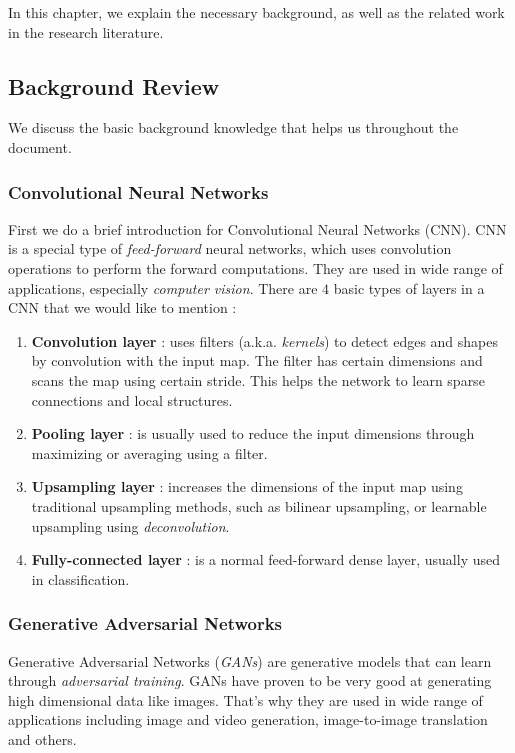 In this chapter, we explain the necessary background, as well as the related work in the research literature.

\subsection{Background Review}
We discuss the basic background knowledge that helps us throughout the document.

\subsubsection{Convolutional Neural Networks}
First we do a brief introduction for Convolutional Neural Networks (CNN). CNN is a special type of \emph{feed-forward} neural networks, which uses convolution operations to perform the forward computations. They are used in wide range of applications, especially \emph{computer vision}. There are $4$ basic types of layers in a CNN that we would like to mention :
\begin{enumerate}
    \item \textbf{Convolution layer} : uses filters (a.k.a. \emph{kernels}) to detect edges and shapes by convolution with the input map. The filter has certain dimensions and scans the map using certain stride. This helps the network to learn sparse connections and local structures.
    \item \textbf{Pooling layer} : is usually used to reduce the input dimensions through maximizing or averaging using a filter.
    \item \textbf{Upsampling layer} : increases the dimensions of the input map using traditional upsampling methods, such as bilinear upsampling, or learnable upsampling using \emph{deconvolution}.
    \item \textbf{Fully-connected layer} : is a normal feed-forward dense layer, usually used in classification.
\end{enumerate}

\subsubsection{Generative Adversarial Networks}
Generative Adversarial Networks (\emph{GANs}) \cite{goodfellow2014generative} are generative models that can learn through \emph{adversarial training}. GANs have proven to be very good at generating high dimensional data like images. That's why they are used in wide range of applications including image and video generation, image-to-image translation and others.

